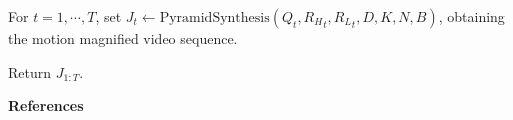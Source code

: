 \documentclass[aspectratio=43]{beamer}
\begin{document}
\begin{frame}[t]
\begin{multicols}{2}
{\begin{minipage}{0.95\columnwidth}
For $t=1,\cdots, T$, set $J_t\gets \text{PyramidSynthesis}(Q_t,{R_H}_t,{R_L}_t,D,K,N,B)$, obtaining the motion magnified video sequence.

\vspace{0.3em}
Return $J_{1:T}$.
\end{minipage}}

\vspace{1em}
\centerline{\large\textbf{References}}

\nocite{*}




\vfill\break
\end{multicols}
\end{frame}
\end{document}
